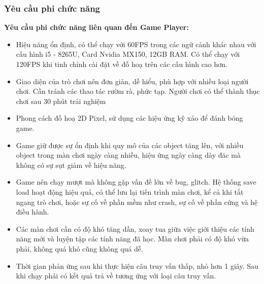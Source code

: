 \subsubsection{Yêu cầu phi chức năng}

\textbf{Yêu cầu phi chức năng liên quan đến Game Player:}
\begin{itemize}
	\item Hiệu năng ổn định, có thể chạy với 60FPS trong các ngữ cảnh khác nhau với cấu hình i5 - 8265U, Card Nvidia MX150, 12GB RAM. Có thể chạy với 120FPS khi tinh chỉnh cài đặt về đồ hoạ trên các cấu hình cao hơn.
	\item Giao diện của trò chơi nên đơn giản, dễ hiểu, phù hợp với nhiều loại người chơi. Cần tránh các thao tác rườm rà, phức tạp.
	Người chơi có thể thành thục chơi sau 30 phút trải nghiệm
	\item Phong cách đồ hoạ 2D Pixel, sử dụng các hiệu ứng kỹ xảo để đánh bóng game.
	\item Game giữ được sự ổn định khi quy mô của các object tăng lên, với nhiều object trong màn chơi ngày càng nhiều, hiệu ứng ngày càng dày đăc mà không có sự sụt giảm về hiệu năng.
	\item Game nên chạy mượt mà không gặp vấn đề lớn về bug, glitch. Hệ thống save load hoạt động hiệu quả, có thể lưu lại tiến trình màn chơi, kể cả khi tắt ngang trò chơi, hoặc sự cố về phần mềm như crash, sự cố về phần cứng và hệ điều hành.
	\item Các màn chơi cần có độ khó tăng dần, xoay tua giữa việc giới thiệu các tính năng mới và luyện tập các tính năng đã học. Màn chơi phải có độ khó vừa phải, không quá khó cũng không quá dễ.
	\item Thời gian phản ứng sau khi thực hiện câu truy vấn thấp, nhỏ hơn 1 giây. Sau khi chạy phải có kết quả trả về tương ứng với loại câu truy vấn.
\end{itemize}
